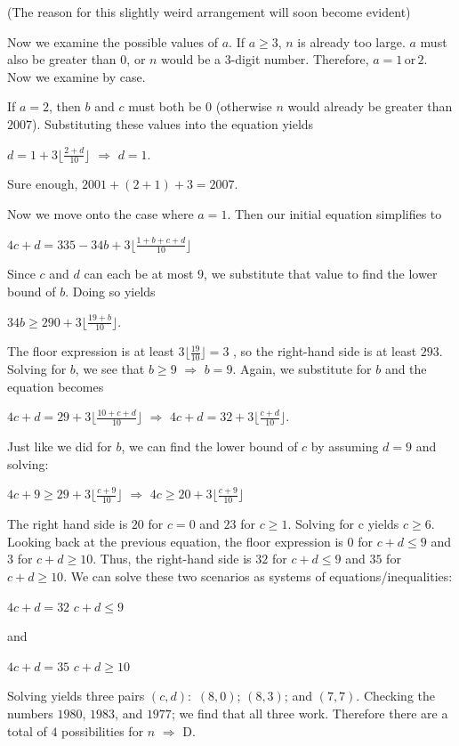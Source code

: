 \begin{enumerate}
 
(The reason for this slightly weird arrangement will soon become evident)

 
Now we examine the possible values of $a$. If $a \ge 3$, $n$ is already too large. $a$ must also be greater than $0$, or $n$ would be a $3$-digit number. Therefore, $a = 1 \, \text{or} \, 2$. Now we examine by case.

 If $a = 2$, then $b$ and $c$ must both be $0$ (otherwise $n$ would already be greater than $2007$). Substituting these values into the equation yields

 
$d = 1 + 3\lfloor\frac{2 + d}{10}\rfloor$
$\Rightarrow$ $d=1$.

 
Sure enough, $2001 + (2+1) + 3=2007$.

 Now we move onto the case where $a = 1$. Then our initial equation simplifies to

 
$4c + d = 335 - 34b + 3\lfloor\frac{1 + b + c + d}{10}\rfloor$

 
Since $c$ and $d$ can each be at most $9$, we substitute that value to find the lower bound of $b$. Doing so yields

 
$34b \ge 290 + 3\lfloor\frac{19 + b}{10}\rfloor$.

 
The floor expression is at least $3\lfloor\frac{19}{10}\rfloor=3$ , so the right-hand side is at least $293$. Solving for $b$, we see that $b \ge 9$ $\Rightarrow$ $b=9$. Again, we substitute for $b$ and the equation becomes

 
$4c + d = 29 + 3\lfloor\frac{10 + c + d}{10}\rfloor$
$\Rightarrow$ $4c + d = 32 + 3\lfloor\frac{c + d}{10}\rfloor$.

 
Just like we did for $b$, we can find the lower bound of $c$ by assuming $d = 9$ and solving:

 
$4c + 9 \ge 29 + 3\lfloor\frac{c + 9}{10}\rfloor$
$\Rightarrow$ $4c \ge 20 + 3\lfloor\frac{c + 9}{10}\rfloor$

 
The right hand side is $20$ for $c=0$ and $23$ for $c \ge 1$. Solving for c yields $c \ge 6$. Looking back at the previous equation, the floor expression is $0$ for $c+d \le 9$ and $3$ for $c+d \ge 10$. Thus, the right-hand side is $32$ for $c+d \le 9$ and $35$ for $c+d \ge 10$. We can solve these two scenarios as systems of equations/inequalities:

 $4c+d = 32$
$c+d \le 9$

 and

 $4c+d=35$
$c+d \ge 10$

 Solving yields three pairs $(c, d):$ $(8, 0)$; $(8, 3)$; and $(7, 7)$. Checking the numbers $1980$, $1983$, and $1977$; we find that all three work. Therefore there are a total of $4$ possibilities for $n$ $\Rightarrow$ $\boxed{\text{D}}$.


\end{enumerate}
